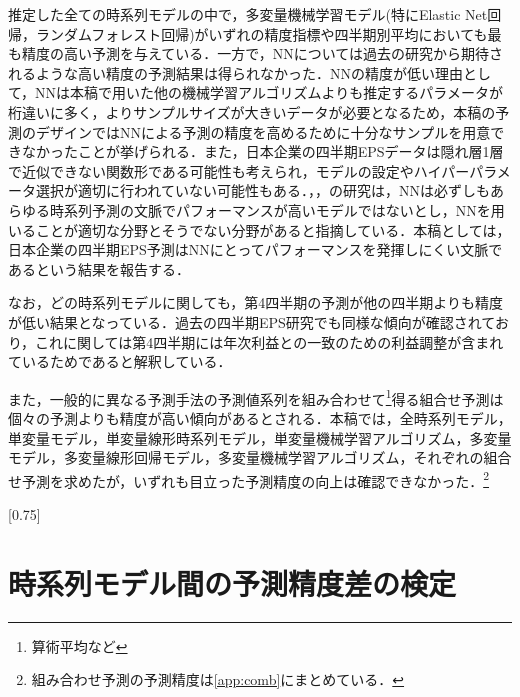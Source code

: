 \documentclass[a4paper，11pt]{jsarticle}
\begin{document}
推定した全ての時系列モデルの中で，多変量機械学習モデル(特にElastic Net回帰，ランダムフォレスト回帰)がいずれの精度指標や四半期別平均においても最も精度の高い予測を与えている．一方で，NNについては過去の研究から期待されるような高い精度の予測結果は得られなかった．NNの精度が低い理由として，NNは本稿で用いた他の機械学習アルゴリズムよりも推定するパラメータが桁違いに多く，よりサンプルサイズが大きいデータが必要となるため，本稿の予測のデザインではNNによる予測の精度を高めるために十分なサンプルを用意できなかったことが挙げられる．また，日本企業の四半期EPSデータは隠れ層1層で近似できない関数形である可能性も考えられ，モデルの設定やハイパーパラメータ選択が適切に行われていない可能性もある．\cite{chatfield1993neural}，\cite{hill1994artificial}，\cite{callen1996neural}の研究は，NNは必ずしもあらゆる時系列予測の文脈でパフォーマンスが高いモデルではないとし，NNを用いることが適切な分野とそうでない分野があると指摘している．本稿としては，日本企業の四半期EPS予測はNNにとってパフォーマンスを発揮しにくい文脈であるという結果を報告する．

なお，どの時系列モデルに関しても，第4四半期の予測が他の四半期よりも精度が低い結果となっている．過去の四半期EPS研究でも同様な傾向が確認されており，これに関して\cite{sakurai1990}は第4四半期には年次利益との一致のための利益調整が含まれているためであると解釈している．

また，一般的に異なる予測手法の予測値系列を組み合わせて\footnote{算術平均など}得る組合せ予測\citep*{bates1969combination}は個々の予測よりも精度が高い傾向があるとされる．本稿では，全時系列モデル，単変量モデル，単変量線形時系列モデル，単変量機械学習アルゴリズム，多変量モデル，多変量線形回帰モデル，多変量機械学習アルゴリズム，それぞれの組合せ予測を求めたが，いずれも目立った予測精度の向上は確認できなかった．\footnote{組み合わせ予測の予測精度は\ref{app:comb}にまとめている．}

\begin{landscape}
  \begin{table}[p]
    \caption{時系列モデルによる1期先四半期EPS予測の精度(1,003社平均)}
    \label{tab:acc}
    \scalebox{0.75}[0.75]{
      
    }
  \end{table}
  \end{landscape}  

\section{時系列モデル間の予測精度差の検定}
\end{document}

